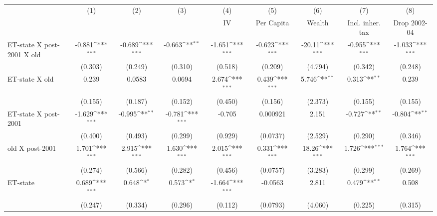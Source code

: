 {
\def\sym#1{\ifmmode^{#1}\else\(^{#1}\)\fi}
\begin{tabular}{l*{8}{c}}
\hline\hline
                &\multicolumn{1}{c}{(1)}&\multicolumn{1}{c}{(2)}&\multicolumn{1}{c}{(3)}&\multicolumn{1}{c}{(4)}&\multicolumn{1}{c}{(5)}&\multicolumn{1}{c}{(6)}&\multicolumn{1}{c}{(7)}&\multicolumn{1}{c}{(8)}\\
                &\multicolumn{1}{c}{}&\multicolumn{1}{c}{}&\multicolumn{1}{c}{}&\multicolumn{1}{c}{IV}&\multicolumn{1}{c}{Per Capita}&\multicolumn{1}{c}{Wealth}&\multicolumn{1}{c}{Incl. inher. tax}&\multicolumn{1}{c}{Drop 2002-04}\\
\hline
ET-state X post-2001 X old&   -0.881\sym{***}&   -0.689\sym{***}&   -0.663\sym{**} &   -1.651\sym{***}&   -0.623\sym{***}&   -20.11\sym{***}&   -0.955\sym{***}&   -1.033\sym{***}\\
                &  (0.303)         &  (0.249)         &  (0.310)         &  (0.518)         &  (0.209)         &  (4.794)         &  (0.342)         &  (0.248)         \\
[1em]
ET-state X old  &    0.239         &   0.0583         &   0.0694         &    2.674\sym{***}&    0.439\sym{***}&    5.746\sym{**} &    0.313\sym{**} &    0.239         \\
                &  (0.155)         &  (0.187)         &  (0.152)         &  (0.450)         &  (0.156)         &  (2.373)         &  (0.155)         &  (0.155)         \\
[1em]
ET-state X post-2001&   -1.629\sym{***}&   -0.995\sym{**} &   -0.781\sym{***}&   -0.705         & 0.000921         &    2.151         &   -0.727\sym{**} &   -0.804\sym{**} \\
                &  (0.400)         &  (0.493)         &  (0.299)         &  (0.929)         & (0.0737)         &  (2.529)         &  (0.290)         &  (0.346)         \\
[1em]
old X post-2001 &    1.701\sym{***}&    2.915\sym{***}&    1.630\sym{***}&    2.015\sym{***}&    0.331\sym{***}&    18.26\sym{***}&    1.726\sym{***}&    1.764\sym{***}\\
                &  (0.274)         &  (0.566)         &  (0.282)         &  (0.456)         & (0.0757)         &  (3.283)         &  (0.299)         &  (0.269)         \\
[1em]
ET-state        &    0.689\sym{***}&    0.648\sym{*}  &    0.573\sym{*}  &   -1.664\sym{***}&  -0.0563         &    2.811         &    0.479\sym{**} &    0.508         \\
                &  (0.247)         &  (0.334)         &  (0.296)         &  (0.112)         & (0.0793)         &  (4.060)         &  (0.225)         &  (0.315)         \\

\end{tabular}}
